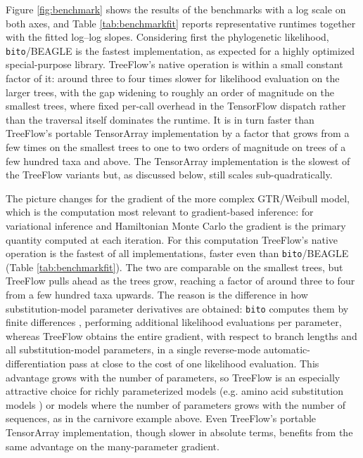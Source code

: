 \documentclass{article}
\begin{document}
Figure \ref{fig:benchmark} shows the results of the benchmarks with a log scale on both axes, and Table \ref{tab:benchmarkfit} reports representative runtimes together with the fitted log--log slopes. Considering first the phylogenetic likelihood, \texttt{bito}/BEAGLE is the fastest implementation, as expected for a highly optimized special-purpose library. TreeFlow's native operation is within a small constant factor of it: around three to four times slower for likelihood evaluation on the larger trees, with the gap widening to roughly an order of magnitude on the smallest trees, where fixed per-call overhead in the TensorFlow dispatch rather than the traversal itself dominates the runtime. It is in turn faster than TreeFlow's portable TensorArray implementation by a factor that grows from a few times on the smallest trees to one to two orders of magnitude on trees of a few hundred taxa and above. The TensorArray implementation is the slowest of the TreeFlow variants but, as discussed below, still scales sub-quadratically.

The picture changes for the gradient of the more complex GTR/Weibull model, which is the computation most relevant to gradient-based inference: for variational inference and Hamiltonian Monte Carlo the gradient is the primary quantity computed at each iteration. For this computation TreeFlow's native operation is the fastest of all implementations, faster even than \texttt{bito}/BEAGLE (Table \ref{tab:benchmarkfit}). The two are comparable on the smallest trees, but TreeFlow pulls ahead as the trees grow, reaching a factor of around three to four from a few hundred taxa upwards. The reason is the difference in how substitution-model parameter derivatives are obtained: \texttt{bito} computes them by finite differences \cite{fourment2023automatic}, performing additional likelihood evaluations per parameter, whereas TreeFlow obtains the entire gradient, with respect to branch lengths and all substitution-model parameters, in a single reverse-mode automatic-differentiation pass at close to the cost of one likelihood evaluation. This advantage grows with the number of parameters, so TreeFlow is an especially attractive choice for richly parameterized models (e.g. amino acid substitution models \cite{adachi1996model}) or models where the number of parameters grows with the number of sequences, as in the carnivore example above. Even TreeFlow's portable TensorArray implementation, though slower in absolute terms, benefits from the same advantage on the many-parameter gradient.
\end{document}

